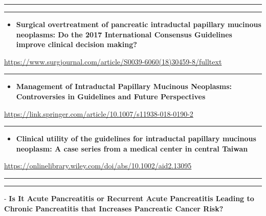 \documentclass[]{article}
\providecommand{\tightlist}{%
  \setlength{\itemsep}{0pt}\setlength{\parskip}{0pt}}
\begin{document}
{}

{}

\begin{center}\rule{0.5\linewidth}{\linethickness}\end{center}

\begin{center}\rule{0.5\linewidth}{\linethickness}\end{center}

\begin{itemize}
\tightlist
\item
  \textbf{Surgical overtreatment of pancreatic intraductal papillary
  mucinous neoplasms: Do the 2017 International Consensus Guidelines
  improve clinical decision making?}
\end{itemize}

\url{https://www.surgjournal.com/article/S0039-6060(18)30459-8/fulltext}

\begin{center}\rule{0.5\linewidth}{\linethickness}\end{center}

\begin{itemize}
\tightlist
\item
  \textbf{Management of Intraductal Papillary Mucinous Neoplasms:
  Controversies in Guidelines and Future Perspectives}
\end{itemize}

\url{https://link.springer.com/article/10.1007/s11938-018-0190-2}

\begin{center}\rule{0.5\linewidth}{\linethickness}\end{center}

\begin{itemize}
\tightlist
\item
  \textbf{Clinical utility of the guidelines for intraductal papillary
  mucinous neoplasm: A case series from a medical center in central
  Taiwan}
\end{itemize}

\url{https://onlinelibrary.wiley.com/doi/abs/10.1002/aid2.13095}

\begin{center}\rule{0.5\linewidth}{\linethickness}\end{center}

\begin{center}\rule{0.5\linewidth}{\linethickness}\end{center}

 - \textbf{Is It Acute Pancreatitis or Recurrent Acute Pancreatitis
Leading to Chronic Pancreatitis that Increases Pancreatic Cancer Risk?}
\end{document}
